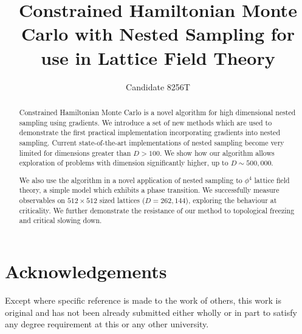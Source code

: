 \documentclass[aps,prd,reprint,preprintnumbers,showpacs,floatfix,nofootinbib,superscript address]{revtex4-2}
\begin{document}
\title{Constrained Hamiltonian Monte Carlo with Nested Sampling for use in Lattice Field Theory}

\author{Candidate 8256T}

\begin{abstract}
     Constrained Hamiltonian Monte Carlo is a novel algorithm for high dimensional nested sampling using gradients.
     We introduce a set of new methods which are used to demonstrate the first
     practical implementation incorporating gradients into nested sampling.
     Current state-of-the-art implementations of nested sampling become very limited for dimensions greater
     than $D > 100$.
     We show how our algorithm allows exploration of problems with dimension significantly higher, up to $D \sim 500,000$.

     We also use the algorithm in a novel application of nested sampling to $\phi^4$ lattice field theory,
     a simple model which exhibits a phase transition.
     We successfully measure observables on $512 \times 512$ sized lattices ($D=262,144$), exploring the behaviour at
     criticality.
     We further demonstrate the resistance of our method to topological freezing and critical slowing down.
\end{abstract}

\maketitle





















\section*{Acknowledgements}
Except where specific reference is made to the work of others, this work is original and has not been already
submitted either wholly or in part to satisfy any degree requirement at this or any other university.
\end{document}
